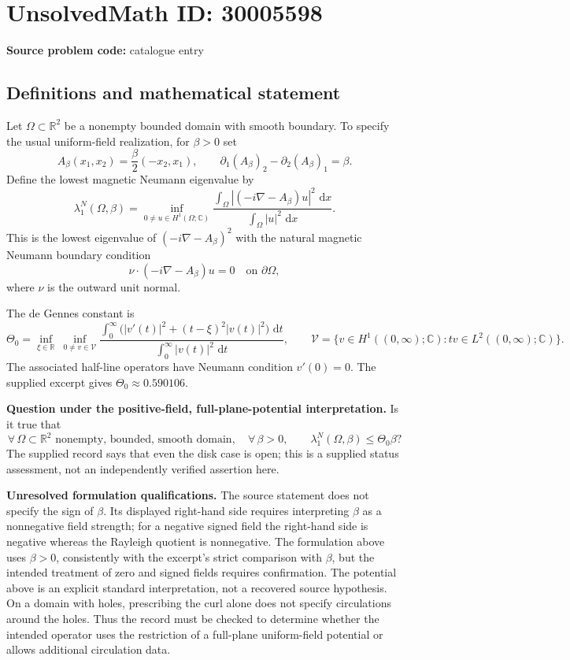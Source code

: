 \documentclass[11pt]{article}
\newcommand{\R}{\mathbb{R}}
\newcommand{\C}{\mathbb{C}}
\newcommand{\dd}{\,\mathrm{d}}
\begin{document}
\section*{UnsolvedMath ID: 30005598}
\textbf{Source problem code:} catalogue entry
\subsection{Definitions and mathematical statement}
Let \(\Omega\subset\R^2\) be a nonempty bounded domain with smooth boundary. To specify the usual uniform-field realization, for \(\beta>0\) set
\[
A_\beta(x_1,x_2)=\frac{\beta}{2}(-x_2,x_1),\qquad \partial_1(A_\beta)_2-\partial_2(A_\beta)_1=\beta.
\]
Define the lowest magnetic Neumann eigenvalue by
\[
\lambda_1^N(\Omega,\beta)
=\inf_{0\ne u\in H^1(\Omega;\C)}
\frac{\displaystyle\int_\Omega|(-i\nabla-A_\beta)u|^2\,\dd x}
{\displaystyle\int_\Omega|u|^2\,\dd x}.
\]
This is the lowest eigenvalue of \((-i\nabla-A_\beta)^2\) with the natural magnetic Neumann boundary condition
\[
\nu\cdot(-i\nabla-A_\beta)u=0\quad\text{on }\partial\Omega,
\]
where \(\nu\) is the outward unit normal.

The de Gennes constant is
\[
\Theta_0=\inf_{\xi\in\R}\ \inf_{0\ne v\in\mathcal V}
\frac{\displaystyle\int_0^\infty\bigl(|v'(t)|^2+(t-\xi)^2|v(t)|^2\bigr)\,\dd t}
{\displaystyle\int_0^\infty|v(t)|^2\,\dd t},
\qquad
\mathcal V=\{v\in H^1((0,\infty);\C):tv\in L^2((0,\infty);\C)\}.
\]
The associated half-line operators have Neumann condition \(v'(0)=0\). The supplied excerpt gives \(\Theta_0\approx0.590106\).

\textbf{Question under the positive-field, full-plane-potential interpretation.} Is it true that
\[
\forall\,\Omega\subset\R^2\text{ nonempty, bounded, smooth domain},\quad
\forall\,\beta>0,\qquad
\lambda_1^N(\Omega,\beta)\leq\Theta_0\beta?
\]
The supplied record says that even the disk case is open; this is a supplied status assessment, not an independently verified assertion here.

\textbf{Unresolved formulation qualifications.} The source statement does not specify the sign of \(\beta\). Its displayed right-hand side requires interpreting \(\beta\) as a nonnegative field strength; for a negative signed field the right-hand side is negative whereas the Rayleigh quotient is nonnegative. The formulation above uses \(\beta>0\), consistently with the excerpt's strict comparison with \(\beta\), but the intended treatment of zero and signed fields requires confirmation. The potential above is an explicit standard interpretation, not a recovered source hypothesis. On a domain with holes, prescribing the curl alone does not specify circulations around the holes. Thus the record must be checked to determine whether the intended operator uses the restriction of a full-plane uniform-field potential or allows additional circulation data.
\end{document}
